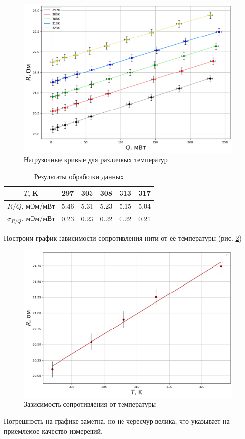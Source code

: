 \documentclass[a4paper,12pt]{article} %
\begin{document}
\begin{figure}[H]
	\begin{center}
		\includegraphics[width=\textwidth]{Нагрузка}\end{center}
	\caption{Нагрузочные кривые для различных температур} \label{нагрузка}
\end{figure}

\begin{table}[H]
	\caption{Результаты обработки данных}
	\label{обработка}
	\begin{tabular}{|c|c|c|c|c|c|}
		\hline
		$T$, K          & 297    & 303    & 308    & 313    & 317\\ \hline
		$R/Q$, мОм/мВт  & 5.46 & 5.31 & 5.23 & 5.15 & 5.04 \\ \hline
		$\sigma_{R/Q}$, мОм/мВт & 0.23 & 0.23 & 0.22  & 0.22 & 0.21 \\ \hline
	\end{tabular}
\end{table}

Построим график зависимости сопротивления нити от её температуры (рис. \ref{R(T)})
\begin{figure}[H]
	\begin{center}
		\includegraphics[width=\textwidth]{R(T)}\end{center}
	\caption{Зависимость сопротивления от температуры} \label{R(T)}
\end{figure}
Погрешность на графике заметна, но не чересчур велика, что указывает на приемлемое качество измерений.
\end{document}
